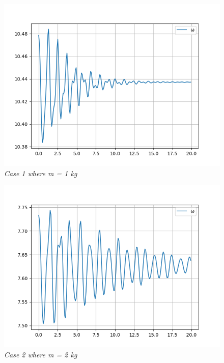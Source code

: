         \begin{figure}[H]
            \centering
            \includegraphics{Appendix/RExpPictures/AF/afm1.png}
            \caption{\textit{Case 1 where m = 1 kg}}
            \label{}
        \end{figure}
            
        \begin{figure}[H]
            \centering
            \includegraphics{Appendix/RExpPictures/AF/afm2.png}
            \caption{\textit{Case 2 where m = 2 kg}}
            \label{}
        \end{figure}
            
